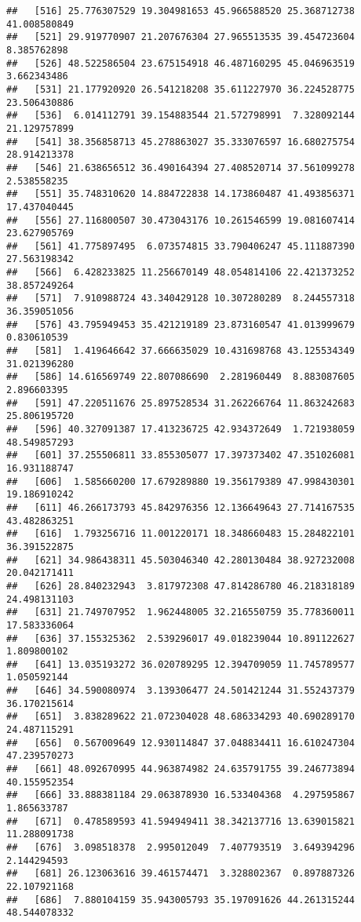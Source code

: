 \documentclass[
]{article}
\begin{document}
\begin{verbatim}
##   [516] 25.776307529 19.304981653 45.966588520 25.368712738 41.008580849
##   [521] 29.919770907 21.207676304 27.965513535 39.454723604  8.385762898
##   [526] 48.522586504 23.675154918 46.487160295 45.046963519  3.662343486
##   [531] 21.177920920 26.541218208 35.611227970 36.224528775 23.506430886
##   [536]  6.014112791 39.154883544 21.572798991  7.328092144 21.129757899
##   [541] 38.356858713 45.278863027 35.333076597 16.680275754 28.914213378
##   [546] 21.638656512 36.490164394 27.408520714 37.561099278  2.538558235
##   [551] 35.748310620 14.884722838 14.173860487 41.493856371 17.437040445
##   [556] 27.116800507 30.473043176 10.261546599 19.081607414 23.627905769
##   [561] 41.775897495  6.073574815 33.790406247 45.111887390 27.563198342
##   [566]  6.428233825 11.256670149 48.054814106 22.421373252 38.857249264
##   [571]  7.910988724 43.340429128 10.307280289  8.244557318 36.359051056
##   [576] 43.795949453 35.421219189 23.873160547 41.013999679  0.830610539
##   [581]  1.419646642 37.666635029 10.431698768 43.125534349 31.021396280
##   [586] 14.616569749 22.807086690  2.281960449  8.883087605  2.896603395
##   [591] 47.220511676 25.897528534 31.262266764 11.863242683 25.806195720
##   [596] 40.327091387 17.413236725 42.934372649  1.721938059 48.549857293
##   [601] 37.255506811 33.855305077 17.397373402 47.351026081 16.931188747
##   [606]  1.585660200 17.679289880 19.356179389 47.998430301 19.186910242
##   [611] 46.266173793 45.842976356 12.136649643 27.714167535 43.482863251
##   [616]  1.793256716 11.001220171 18.348660483 15.284822101 36.391522875
##   [621] 34.986438311 45.503046340 42.280130484 38.927232008 20.042171411
##   [626] 28.840232943  3.817972308 47.814286780 46.218318189 24.498131103
##   [631] 21.749707952  1.962448005 32.216550759 35.778360011 17.583336064
##   [636] 37.155325362  2.539296017 49.018239044 10.891122627  1.809800102
##   [641] 13.035193272 36.020789295 12.394709059 11.745789577  1.050592144
##   [646] 34.590080974  3.139306477 24.501421244 31.552437379 36.170215614
##   [651]  3.838289622 21.072304028 48.686334293 40.690289170 24.487115291
##   [656]  0.567009649 12.930114847 37.048834411 16.610247304 47.239570273
##   [661] 48.092670995 44.963874982 24.635791755 39.246773894 40.155952354
##   [666] 33.888381184 29.063878930 16.533404368  4.297595867  1.865633787
##   [671]  0.478589593 41.594949411 38.342137716 13.639015821 11.288091738
##   [676]  3.098518378  2.995012049  7.407793519  3.649394296  2.144294593
##   [681] 26.123063616 39.461574471  3.328802367  0.897887326 22.107921168
##   [686]  7.880104159 35.943005793 35.197091626 44.261315244 48.544078332

\end{verbatim}
\end{document}
